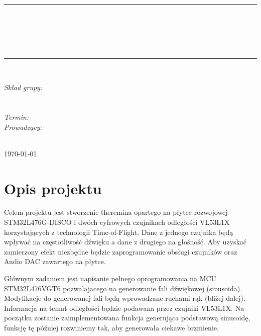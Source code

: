 \documentclass[10pt, a4paper]{article}
\begin{document}
\def\tablename{Tabela}	%

\begin{titlepage}
	\begin{center}
		\textsc{\LARGE \formakursu}\\[1cm]		
		\textsc{\Large \kurs}\\[0.5cm]		
		\rule{\textwidth}{0.08cm}\\[0.4cm]
		{\huge \bfseries \doctype}\\[1cm]
		{\huge \bfseries \projectname}\\[0.5cm]
		{\huge \bfseries \acronim}\\[0.4cm]
		\rule{\textwidth}{0.08cm}\\[1cm]
		
		\begin{flushright} \large
		\emph{Skład grupy:}\\
		\osobaA\\
		\osobaB\\[0.4cm]
		
		\emph{Termin: }\termin\\[0.4cm]

		\emph{Prowadzący:} \\
		\prowadzacy \\
		
		\end{flushright}
		
		\vfill
		
		{\large \today}
	\end{center}	
\end{titlepage}

\newpage
\tableofcontents
\newpage

\section{Opis projektu}
\label{sec:OpisProjektu}

Celem projektu jest stworzenie theremina opartego na płytce rozwojowej STM32L476G-DISCO\cite{DevBoard} i dwóch cyfrowych czujnikach odległości VL53L1X\cite{VL53L1X} korzystających z technologii Time-of-Flight. Dane z jednego czujnika będą wpływać na częstotliwość dźwięku a dane z drugiego na głośność. Aby uzyskać zamierzony efekt niezbędne będzie zaprogramowanie obsługi czujników oraz Audio DAC\cite{CS43L22} zawartego na płytce. 

Głównym zadaniem jest napisanie pełnego oprogramowania na MCU STM32L476VGT6\cite{MCU} pozwalajacego na generowanie fali dźwiękowej (sinusoida)\cite{AN3126}. Modyfikacje do generowanej fali będą wprowadzane ruchami rąk (bliżej-dalej). Informacja na temat odległości będzie podawana przez czujniki VL53L1X. Na początku zostanie zaimplementowana funkcja generująca podstawową sinusoidę, funkcję tę później rozwiniemy tak, aby generowała ciekawe brzmienie.
\end{document}
